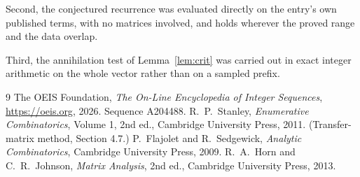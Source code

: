 \documentclass[11pt,a4paper]{article}
\theoremstyle{plain}
\theoremstyle{definition}
\begin{document}
Second, the conjectured recurrence was evaluated directly on the entry's own published terms,
with no matrices involved, and holds wherever the proved range and the data overlap.

Third, the annihilation test of Lemma~\ref{lem:crit} was carried out in exact integer
arithmetic on the whole vector rather than on a sampled prefix.

\begin{thebibliography}{9}
 The OEIS Foundation, \emph{The On-Line Encyclopedia of Integer
Sequences}, \url{https://oeis.org}, 2026. Sequence A204488.
 R.~P.~Stanley, \emph{Enumerative Combinatorics}, Volume 1, 2nd ed.,
Cambridge University Press, 2011. (Transfer-matrix method, Section 4.7.)
 P.~Flajolet and R.~Sedgewick, \emph{Analytic Combinatorics}, Cambridge
University Press, 2009.
 R.~A.~Horn and C.~R.~Johnson, \emph{Matrix Analysis}, 2nd ed., Cambridge
University Press, 2013.
\end{thebibliography}
\end{document}
